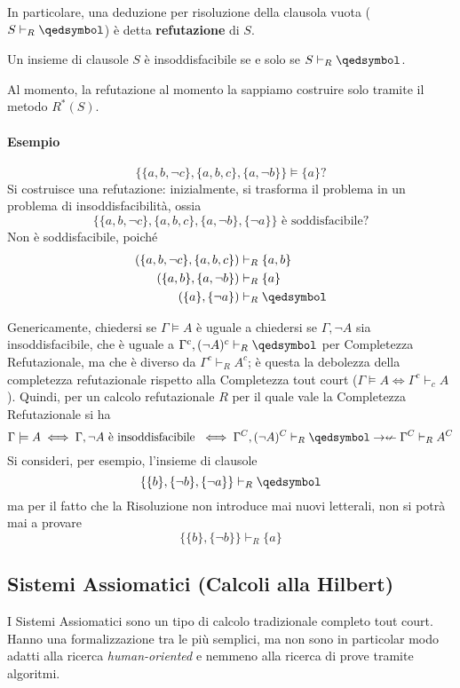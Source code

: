 In particolare, una deduzione per risoluzione della clausola vuota 
($S \vdash_R \qedsymbol$) è detta \textbf{refutazione} di $S$. 
\begin{teo}
        Un insieme di clausole $S$ è insoddisfacibile se e solo se $S \vdash_R \qedsymbol$.
\end{teo}
Al momento, la refutazione al momento la sappiamo costruire solo tramite 
il metodo $R^*(S)$. 

\paragraph{Esempio}
$$
\{\{a, b, \neg c\}, \{a, b, c\}, \{a, \neg b\}\} \models \{a\}?
$$
Si costruisce una refutazione: 
inizialmente, si trasforma il problema in un problema di insoddisfacibilità, 
ossia 
$$
\{\{a, b, \neg c\}, \{a, b, c\}, \{a, \neg b\}, \{\neg a\}\} \text{ è soddisfacibile?}
$$
Non è soddisfacibile, poiché 
\begin{align*}
        (\{a,b,\neg c\}, \{a, b, c\}) &\vdash_R \{a,b\} \\
        (\{a,b\}, \{a, \neg b\}) &\vdash_R \{a\}\\
        (\{a\}, \{\neg a\}) &\vdash_R \qedsymbol
\end{align*}

\noindent
Genericamente, chiedersi se $\Gamma \models A$ è uguale a chiedersi 
se $\Gamma, \neg A$ sia insoddisfacibile, che è 
 uguale a $\Gamma ^c, (\neg A)^c \vdash_R \qedsymbol$ per Completezza 
 Refutazionale, ma che è diverso da 
$\Gamma^c \vdash_R A^c$; è questa la debolezza 
della completezza refutazionale rispetto alla Completezza tout court
($\Gamma \models A \iff \Gamma^c \vdash_c A$). Quindi, per un calcolo 
refutazionale $R$ per il quale vale la Completezza Refutazionale si ha 
$$
\Gamma \models A \iff \Gamma, \neg A \text{ è insoddisfacibile } \iff \Gamma^C, (\neg A)^C \vdash_R \qedsymbol \rightarrow \nleftarrow \Gamma^C \vdash_R A^C
$$
Si consideri, per esempio, l'insieme di clausole 
$$
\{\{b\}, \{\neg b\}, \{\neg a\}\} \vdash_R \qedsymbol
$$
ma per il fatto che la Risoluzione non introduce mai nuovi letterali, 
non si potrà mai a provare 
$$
\{\{b\},\{\neg b\}\} \vdash_R \{a\}
$$
\subsection{Sistemi Assiomatici (Calcoli alla Hilbert)}
I Sistemi Assiomatici sono un tipo di calcolo tradizionale completo 
tout court. Hanno una formalizzazione tra le più semplici, ma non 
sono in particolar modo adatti alla ricerca \textit{human-oriented} e nemmeno 
alla ricerca di prove tramite algoritmi. 

